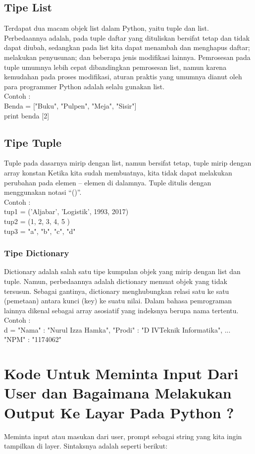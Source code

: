 \subsection{Tipe List}
Terdapat dua macam objek list dalam Python, yaitu tuple dan list. Perbedaannya adalah, pada tuple daftar yang dituliskan bersifat tetap dan tidak dapat diubah, sedangkan pada list kita dapat menambah dan menghapus daftar; melakukan penyusunan; dan beberapa jenis modifikasi lainnya. Pemrosesan pada tuple umumnya lebih cepat dibandingkan pemrosesan list, namun karena kemudahan pada proses modifikasi, aturan praktis yang umumnya dianut oleh para programmer Python adalah selalu gunakan list.\\

Contoh :\\
Benda = ["Buku", "Pulpen", "Meja", "Sisir"]\\
print benda [2]

\subsection{Tipe Tuple}
Tuple pada dasarnya mirip dengan list, namun bersifat tetap, tuple mirip dengan array konstan Ketika kita sudah membuatnya, kita tidak dapat melakukan perubahan pada elemen – elemen di dalamnya. Tuple ditulis dengan menggunakan notasi “()”.\\
Contoh : \\
tup1 = ('Aljabar', 'Logistik', 1993, 2017)\\
tup2 = (1, 2, 3, 4, 5 )\\
tup3 = "a", "b", "c", "d"\\
\subsubsection{Tipe Dictionary}

Dictionary adalah salah satu tipe kumpulan objek yang mirip dengan list dan tuple. Namun, perbedaannya adalah dictionary memuat objek yang tidak tersusun. Sebagai gantinya, dictionary menghubungkan relasi satu ke satu (pemetaan) antara kunci (key) ke suatu nilai. Dalam bahasa pemrograman lainnya dikenal sebagai array asosiatif yang indeksnya berupa nama tertentu.\\

Contoh :\\
d = {"Nama" : "Nurul Izza Hamka", "Prodi" : "D IVTeknik Informatika", ... "NPM" : "1174062"}

\section{Kode Untuk Meminta Input Dari User dan Bagaimana Melakukan Output Ke Layar Pada Python ?}
Meminta input atau masukan dari user, prompt sebagai string yang kita ingin tampilkan di layer.  Sintaksnya adalah seperti berikut:\\

